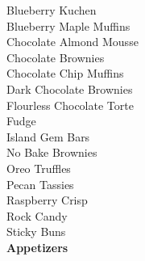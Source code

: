 \documentclass[11pt, twoside, openany]{book}
\begin{document}
Blueberry Kuchen\hrulefill\pageref{blueberry-kuchen}\\
Blueberry Maple Muffins\hrulefill\pageref{blueberry-maple-muffins}\\
Chocolate Almond Mousse\hrulefill\pageref{chocolate-almond-mousse}\\
Chocolate Brownies\hrulefill\pageref{chocolate-brownies}\\
Chocolate Chip Muffins\hrulefill\pageref{chocolate-chip-muffins}\\
Dark Chocolate Brownies\hrulefill\pageref{dark-chocolate-brownies}\\
Flourless Chocolate Torte\hrulefill\pageref{flourless-chocolate-torte}\\
Fudge\hrulefill\pageref{fudge}\\
Island Gem Bars\hrulefill\pageref{island-gem-bars}\\
No Bake Brownies\hrulefill\pageref{no-bake-brownies}\\
Oreo Truffles\hrulefill\pageref{oreo-truffles}\\
Pecan Tassies\hrulefill\pageref{pecan-tassies}\\
Raspberry Crisp\hrulefill\pageref{raspberry-crisp}\\
Rock Candy\hrulefill\pageref{rock-candy}\\
Sticky Buns\hrulefill\pageref{sticky-buns}\\
{\newpage \LARGE \textbf{Appetizers}} \label{appetizers}\\
\end{document}
